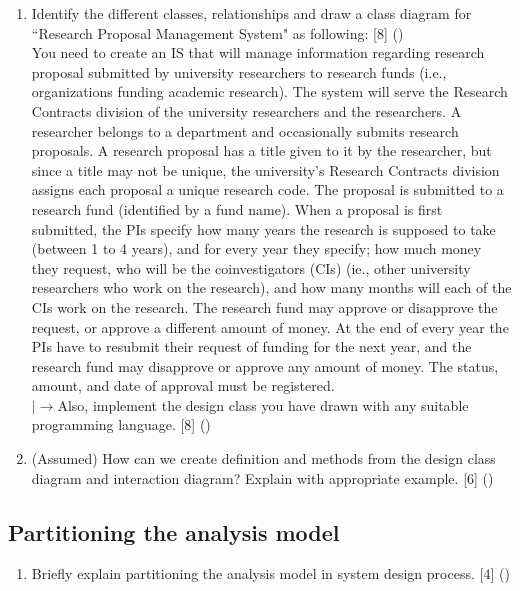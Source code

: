 \documentclass[12pt]{article}
\newcommand{\lb}{\\$\left|\rightarrow\right.$}
\begin{document}
\begin{enumerate}
      \item Identify the different classes, relationships and draw a class diagram for ``Research Proposal Management System" as following: \hfill [8] ()\\
        You need to create an IS that will manage information regarding research proposal submitted by university researchers to research funds (i.e., organizations funding academic research). The system will serve the Research Contracts division of the university researchers and the researchers. A researcher belongs to a department and occasionally submits research proposals. A research proposal has a title given to it by the researcher, but since a title may not be unique, the university's Research Contracts division assigns each proposal a unique research code. The proposal is submitted to a research fund (identified by a fund name). When a proposal is first submitted, the PIs specify how many years the research is supposed to take (between 1 to 4 years), and for every year they specify; how much money they request, who will be the coinvestigators (CIs) (ie., other university researchers who work on the research), and how many months will each of the CIs work on the research. The research fund may approve or disapprove the request, or approve a different amount of money. At the end of every year the PIs have to resubmit their request of funding for the next year, and the research fund may disapprove or approve any amount of money. The status, amount, and date of approval must be registered.
        \lb Also, implement the design class you have drawn with any suitable programming language. \hfill [8] ()

      \item (Assumed) How can we create definition and methods from the design class diagram and interaction diagram? Explain with appropriate example. \hfill [6] ()
     
    \end{enumerate}

  \subsection{Partitioning the analysis model}
    \begin{enumerate}
      \item Briefly explain partitioning the analysis model in system design process. \hfill [4] ()
    \end{enumerate}
\end{document}
